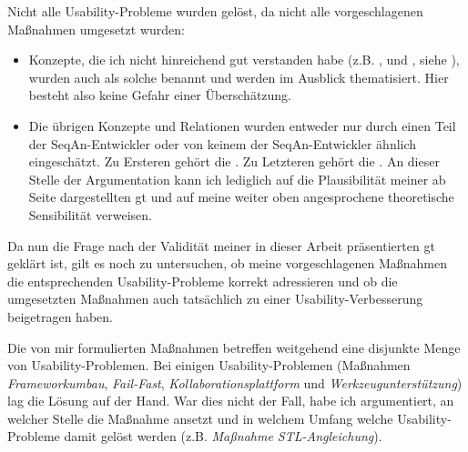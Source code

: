 \begin{description}
  Nicht alle Usability-Probleme wurden gelöst, da nicht alle vorgeschlagenen Maßnahmen umgesetzt wurden:
  \begin{itemize}
    \item Konzepte, die ich nicht hinreichend gut verstanden habe (z.B. ,  und , siehe ), wurden auch als solche benannt und werden im Ausblick thematisiert. Hier besteht also keine Gefahr einer Überschätzung.
    \item Die übrigen Konzepte und Relationen wurden entweder nur durch einen Teil der SeqAn-Entwickler oder von keinem der SeqAn-Entwickler ähnlich eingeschätzt. Zu Ersteren gehört die . Zu Letzteren gehört die . An dieser Stelle der Argumentation kann ich lediglich auf die Plausibilität meiner ab Seite \pageref{sec:gt} dargestellten \gls{gt} und auf meine weiter oben angesprochene theoretische Sensibilität verweisen. 
  \end{itemize}
\end{description}



Da nun die Frage nach der Validität meiner in dieser Arbeit präsentierten \gls{gt} geklärt ist, gilt es noch zu untersuchen, ob meine vorgeschlagenen Maßnahmen die entsprechenden Usability-Probleme korrekt adressieren und ob die umgesetzten Maßnahmen auch tatsächlich zu einer Usability-Verbesserung beigetragen haben.

Die von mir formulierten Maßnahmen betreffen weitgehend eine disjunkte Menge von Usability-Problemen. Bei einigen Usability-Problemen (Maßnahmen \textit{Frameworkumbau}, \textit{Fail-Fast}, \textit{Kollaborationsplattform} und \textit{Werkzeugunterstützung}) lag die Lösung auf der Hand. War dies nicht der Fall, habe ich argumentiert, an welcher Stelle die Maßnahme ansetzt und in welchem Umfang welche Usability-Probleme damit gelöst werden (z.B. \textit{Maßnahme STL-Angleichung}).

